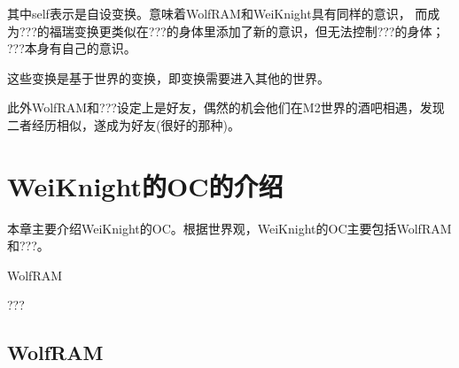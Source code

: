 \documentclass[lang=cn,newtx,10pt,scheme=chinese]{elegantbook}
\newcommand{\wf}{WolfRAM}
\newcommand{\dr}{???}
\newcommand{\wkn}{WeiKnight}
\begin{document}
其中self表示是自设变换。意味着\wf{}和\wkn{}具有同样的意识，
而成为\dr{}的福瑞变换更类似在\dr{}的身体里添加了新的意识，但无法控制\dr{}的身体；
\dr{}本身有自己的意识。

这些变换是基于世界的变换，即变换需要进入其他的世界。

此外\wf{}和\dr{}设定上是好友，偶然的机会他们在M2世界的酒吧相遇，发现二者经历相似，遂成为好友(很好的那种)。

\chapter{\wkn{}的OC的介绍}

本章主要介绍\wkn{}的OC。根据世界观，\wkn{}的OC主要包括\wf{}和\dr{}。
\begin{introduction}
    \item \wf{}
    \item \dr{}
\end{introduction}

\section{\wf{}}
\end{document}
